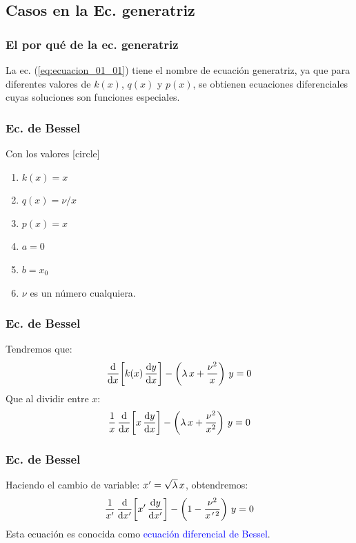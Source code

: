 \documentclass[12pt]{beamer}
\begin{document}
\subsection{Casos en la Ec. generatriz}

\begin{frame}
\frametitle{El por qué de la ec. generatriz}
La ec. (\ref{eq:ecuacion_01_01}) tiene el nombre de ecuación generatriz, ya que para diferentes valores de $k(x)$, $q(x)$ y $p(x)$, se obtienen ecuaciones diferenciales cuyas soluciones son funciones especiales.
\end{frame}

\begin{frame}
\frametitle{Ec. de Bessel}
Con los valores
[circle]
\begin{enumerate}[<+->]
\item $k(x) = x$
\item $q(x) = \nu / x$
\item $p(x) = x$
\item $a = 0$
\item $b = x_{0}$
\item $\nu$ es un número cualquiera.
\end{enumerate}
\end{frame}
\begin{frame}
\frametitle{Ec. de Bessel}
Tendremos que:
\begin{align}
\dv{x} \bigg[ k(x) \, \dv{y}{x} \bigg] -  \left( \lambda \, x  + \dfrac{\nu^{2}}{x} \right) \, y = 0
\label{eq:ecuacion_01_02}
\end{align}
\pause
Que al dividir entre $x$:
\pause
\begin{align}
\dfrac{1}{x} \, \dv{x} \bigg[ x \, \dv{y}{x} \bigg] -  \left( \lambda \, x  + \dfrac{\nu^{2}}{x^{2}} \right) \, y = 0
\label{eq:ecuacion_01_03}
\end{align}
\end{frame}
\begin{frame}
\frametitle{Ec. de Bessel}
Haciendo el cambio de variable: ${x}^{\prime} = \sqrt{\lambda} \, x$, obtendremos:
\pause
\begin{align}
\dfrac{1}{{x}^{\prime}} \, \dv{\ensuremath{{x}^{\prime}}} \bigg[ {x}^{\prime} \, \dv{y}{\ensuremath{{x}^{\prime}}} \bigg] -  \left( 1 - \dfrac{\nu^{2}}{x^{\, \prime \, 2}} \right) \, y = 0
\label{eq:ecuacion_01_04}
\end{align}
\pause
Esta ecuación es conocida como \textcolor{blue}{ecuación diferencial de Bessel}.
\end{frame}
\end{document}
